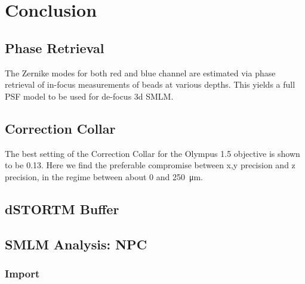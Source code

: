 \documentclass[11pt, a4paper, oneside, twocolumn]{report}
\begin{document}
\chapter{Conclusion}

\section{Phase Retrieval}

The Zernike modes for both red and blue channel are estimated via
phase retrieval of in-focus measurements of beads at various
depths. This yields a full PSF model to be used for de-focus 3d SMLM.


\section{Correction Collar}

The best setting of the Correction Collar for the Olympus \SI{1.5}{\NA}
objective is shown to be 0.13. Here we find the preferable compromise
between x,y precision and z precision, in the regime between about 0
and \SI{250}{\micro\meter}.


\section{dSTORTM Buffer}


\appendix


\section{SMLM Analysis: NPC}

\onecolumn


\subsection{Import}
\end{document}
